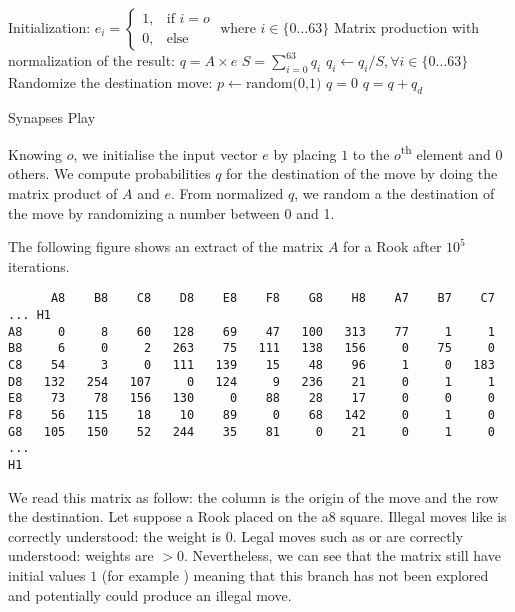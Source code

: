 \documentclass[a4paper,10pt]{article}
\begin{document}
\begin{algorithm}
  \label{alg:SynapsesPlay}
  \DontPrintSemicolon
  Initialization:\;
  $e_i =
  \begin{cases}
    1,& \text{if } i = o \\
    0,& \text{else}
  \end{cases} \text{ where } i \in \{0 \dotsc 63\}$\;
  Matrix production with normalization of the result:\;
  $q = A \times e$\;
  $S = \sum_{i=0}^{63}q_i$\;
  $q_i \gets q_i / S, \forall i \in \{0 \dotsc 63\}$\;
  Randomize the destination move:\;
  $p \gets \text{random(0,1)}$\;
  $q = 0$\;
  {
    $q = q + q_d$\;
       {
       }
  }
  \caption{Synapses Play}
\end{algorithm}

Knowing $o$, we initialise the input vector $e$ by placing $1$ to the
$o$\textsuperscript{th} element and 0 others. We compute probabilities $q$ for
the destination of the move by doing the matrix product of $A$ and $e$. From
normalized $q$, we random a the destination of the move by randomizing a number
between 0 and 1.

The following figure shows an extract of the matrix $A$ for a Rook after $10^5$
iterations.

\begin{verbatim}
      A8    B8    C8    D8    E8    F8    G8    H8    A7    B7    C7 ... H1
A8     0     8    60   128    69    47   100   313    77     1     1
B8     6     0     2   263    75   111   138   156     0    75     0
C8    54     3     0   111   139    15    48    96     1     0   183
D8   132   254   107     0   124     9   236    21     0     1     1
E8    73    78   156   130     0    88    28    17     0     0     0
F8    56   115    18    10    89     0    68   142     0     1     0
G8   105   150    52   244    35    81     0    21     0     1     0
...
H1
\end{verbatim}

We read this matrix as follow: the column is the origin of the move and the row
the destination. Let suppose a Rook placed on the a8 square. Illegal moves like
 is correctly understood: the weight is $0$. Legal moves such as
 or  are correctly understood: weights are
$>0$. Nevertheless, we can see that the matrix still have initial values $1$
(for example ) meaning that this branch has not been explored and
potentially could produce an illegal move.
\end{document}
